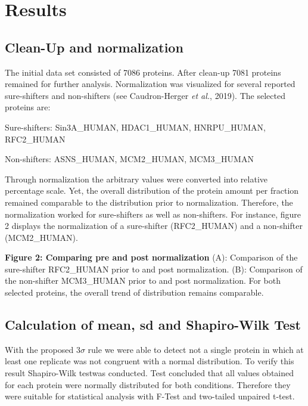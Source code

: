 \documentclass[
]{article}
\begin{document}
\newpage

\hypertarget{results}{%
\section{Results}\label{results}}

\hypertarget{clean-up-and-normalization}{%
\subsection{Clean-Up and
normalization}\label{clean-up-and-normalization}}

The initial data set consisted of 7086 proteins. After clean-up 7081
proteins remained for further analysis. Normalization was visualized for
several reported sure-shifters and non-shifters (see Caudron-Herger
\emph{et al.}, 2019). The selected proteins are:

Sure-shifters: Sin3A\_HUMAN, HDAC1\_HUMAN, HNRPU\_HUMAN, RFC2\_HUMAN

Non-shifters: ASNS\_HUMAN, MCM2\_HUMAN, MCM3\_HUMAN

Through normalization the arbitrary values were converted into relative
percentage scale. Yet, the overall distribution of the protein amount
per fraction remained comparable to the distribution prior to
normalization. Therefore, the normalization worked for sure-shifters as
well as non-shifters. For instance, figure 2 displays the normalization
of a sure-shifter (RFC2\_HUMAN) and a non-shifter (MCM2\_HUMAN).

\textbf{Figure 2: Comparing pre and post normalization} (A): Comparison
of the sure-shifter RFC2\_HUMAN prior to and post normalization. (B):
Comparison of the non-shifter MCM3\_HUMAN prior to and post
normalization. For both selected proteins, the overall trend of
distribution remains comparable.

\hypertarget{calculation-of-mean-sd-and-shapiro-wilk-test}{%
\subsection{Calculation of mean, sd and Shapiro-Wilk
Test}\label{calculation-of-mean-sd-and-shapiro-wilk-test}}

With the proposed 3\(\sigma\) rule we were able to detect not a single
protein in which at least one replicate was not congruent with a normal
distribution. To verify this result Shapiro-Wilk testwas conducted. Test
concluded that all values obtained for each protein were normally
distributed for both conditions. Therefore they were suitable for
statistical analysis with F-Test and two-tailed unpaired t-test.
\end{document}
